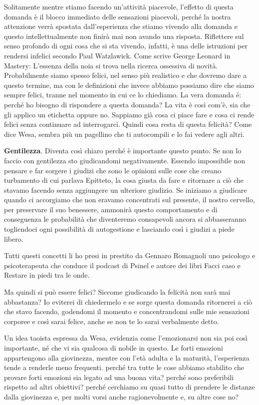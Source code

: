 \documentclass[12pt]{book} %
\begin{document}
Solitamente mentre stiamo facendo un'attività
piacevole, l'effetto di questa domanda è il blocco immediato delle sensazioni piacevoli, perché la
nostra attenzione verrà spostata dall'esperienza che stiamo vivendo alla domanda e questo
intellettualmente non finirà mai non avando una risposta. Riflettere sul senso profondo di ogni cosa che si sta
vivendo, infatti, è una delle istruzioni per rendersi infelici secondo Paul Watzlawick. Come scrive George
Leonard in Mastery: L'essenza della noia si trova nella ricerca ossessiva di novità. Probabilmente
siamo spesso felici, nel senso più realistico e che dovremo dare a questo termine, ma con le definizioni che invece
abbiamo possiamo dire che siamo sempre felici, tranne nel momento in cui ce lo chiediamo.
La vera domanda é: perché ho bisogno di rispondere a questa domanda? La vita è così com'è, sia che gli applico un etichetta oppure no. Sappiamo già cosa ci piace fare e cosa ci rende felici senza continuare ad interrogarci. Quindi cosa resta di questa felicità? Come dice Wesa, sembra più un pagellino che ti autocompili e lo fai vedere agli altri. 

\textbf{Gentilezza}. Diventa così chiaro perché è importante questo punto. Se non lo faccio con gentilezza sto giudicandomi
negativamente. Essendo impossibile non pensare e far sorgere i giudizi che sono le opinioni sulle cose che creano
turbamento di cui parlava Epitteto, la cosa giusta da fare e ritornare a ciò che stavamo facendo senza aggiungere un
ulteriore giudizio. Se iniziamo a giudicare quando ci accorgiamo che non eravamo concentrati sul presente, il nostro
cervello, per preservare il suo benessere, ammonirà questo comportamento e di conseguenza le probabilità che
diventeremo consapevoli ancora si abbasseranno togliendoci ogni possibilità di autogestione e lasciando così i giudizi
a piede libero.

Tutti questi concetti li ho presi in prestito da Gennaro Romagnoli uno psicologo e psicoterapeuta che conduce il podcast
di Psinel e autore dei libri Facci caso e Restare in piedi tra le onde.

Ma quindi si può essere felici? Siccome giudicando la felicità non sarà mai abbastanza? Io eviterei di chiedermelo e se
sorge questa domanda ritornerei a ciò che stavo facendo, godendomi il momento e concentrandomi sulle mie sensazioni
corporee e così sarai felice, anche se non te lo sarai verbalmente detto. 

Un idea taoista espressa da Wesa, evidenzia come l'emozionarsi non sia poi così importante, né che vi sia qualcosa di nobile in questo. Le forti emozioni appartengono alla giovinezza, mentre con l'età adulta e la maturità, l'esperienza tende a renderle meno frequenti. perché tra tutte le cose abbiamo stabilito che provare forti emozioni sia legato ad una buona vita? perché sono preferibili rispetto ad altri obiettivi? perché cerchiamo su quasi tutto di prendere le distanze dalla giovinezza e, per molti vorsi anche ragionevolmente e, su altre cose no?
\end{document}

